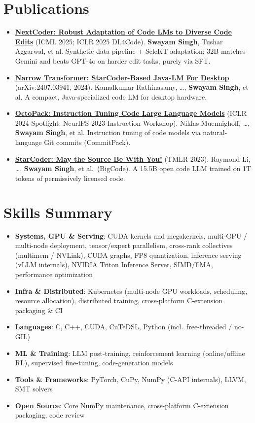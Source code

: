 \documentclass[a4paper,11pt]{article}
\newcommand{\resumeItem}[2]{\item\small{\textbf{#1}: #2}\vspace{-1pt}}
\newcommand{\resumeItemPlain}[1]{\item\small{#1}\vspace{-1pt}}
\newcommand{\resumeItemListStart}{\begin{itemize}[leftmargin=1.3em, label=$\bullet$, itemsep=1pt, topsep=2pt, parsep=0pt]}
\newcommand{\resumeItemListEnd}{\end{itemize}\vspace{-3pt}}
\begin{document}
\vspace{-2pt}
\section{Publications}
\resumeItemListStart
  \resumeItemPlain{\textbf{\href{https://www.microsoft.com/en-us/research/publication/nextcoder-robust-adaptation-of-code-lms-to-diverse-code-edits/}{NextCoder: Robust Adaptation of Code LMs to Diverse Code Edits}} (ICML 2025; ICLR 2025 DL4Code). \textbf{Swayam Singh}, Tushar Aggarwal, et al. Synthetic-data pipeline + SeleKT adaptation; 32B matches Gemini and beats GPT-4o on harder edit tasks, purely via SFT.}
  \resumeItemPlain{\textbf{\href{https://arxiv.org/abs/2407.03941}{Narrow Transformer: StarCoder-Based Java-LM For Desktop}} (arXiv:2407.03941, 2024). Kamalkumar Rathinasamy, \ldots, \textbf{Swayam Singh}, et al. A compact, Java-specialized code LM for desktop hardware.}
  \resumeItemPlain{\textbf{\href{https://arxiv.org/abs/2308.07124}{OctoPack: Instruction Tuning Code Large Language Models}} (ICLR 2024 Spotlight; NeurIPS 2023 Instruction Workshop). Niklas Muennighoff, \ldots, \textbf{Swayam Singh}, et al. Instruction tuning of code models via natural-language Git commits (CommitPack).}
  \resumeItemPlain{\textbf{\href{https://arxiv.org/abs/2305.06161}{StarCoder: May the Source Be With You!}} (TMLR 2023). Raymond Li, \ldots, \textbf{Swayam Singh}, et al.\ (BigCode). A 15.5B open code LLM trained on 1T tokens of permissively licensed code.}
\resumeItemListEnd

\vspace{-2pt}
\section{Skills Summary}
\resumeItemListStart
  \resumeItem{Systems, GPU \& Serving}{CUDA kernels and megakernels, multi-GPU / multi-node deployment, tensor/expert parallelism, cross-rank collectives (multimem / NVLink), CUDA graphs, FP8 quantization, inference serving (vLLM internals), NVIDIA Triton Inference Server, SIMD/FMA, performance optimization}
  \resumeItem{Infra \& Distributed}{Kubernetes (multi-node GPU workloads, scheduling, resource allocation), distributed training, cross-platform C-extension packaging \& CI}
  \resumeItem{Languages}{C, C++, CUDA, CuTeDSL, Python (incl.\ free-threaded / no-GIL)}
  \resumeItem{ML \& Training}{LLM post-training, reinforcement learning (online/offline RL), supervised fine-tuning, code-generation models}
  \resumeItem{Tools \& Frameworks}{PyTorch, CuPy, NumPy (C-API internals), LLVM, SMT solvers}
  \resumeItem{Open Source}{Core NumPy maintenance, cross-platform C-extension packaging, code review}
\resumeItemListEnd
\end{document}
